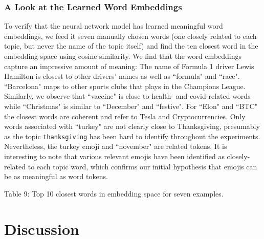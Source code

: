 \documentclass[11pt]{article}
\begin{document}
\subsubsection{A Look at the Learned Word Embeddings}
To verify that the neural network model has learned meaningful word embeddings, we feed it seven manually chosen words (one closely related to each topic, but never the name of the topic itself) and find the ten closest word in the embedding space using cosine similarity. We find that the word embeddings capture an impressive amount of meaning: The name of Formula 1 driver Lewis Hamilton is closest to other drivers' names as well as ``formula" and ``race". ``Barcelona" maps to other sports clubs that plays in the Champions League. Similarly,  we observe that ``vaccine" is close to health- and covid-related words while ``Christmas" is similar to ``December" and ``festive". For ``Elon" and ``BTC" the closest words are coherent and refer to Tesla and Cryptocurrencies. Only words associated with ``turkey" are not clearly close to Thanksgiving, presumably as the topic \texttt{thanksgiving} has been hard to identify throughout the experiments. Nevertheless, the turkey emoji and ``november" are related tokens. It is interesting to note that various relevant emojis have been identified as closely-related to each topic word, which confirms our initial hypothesis that emojis can be as meaningful as word tokens.
\\

\begin{adjustbox}{width=\columnwidth,center}

\end{adjustbox}
\begin{center}
	Table 9: Top 10 closest words in embedding space for seven examples.
\end{center}


\section{Discussion}
\end{document}
